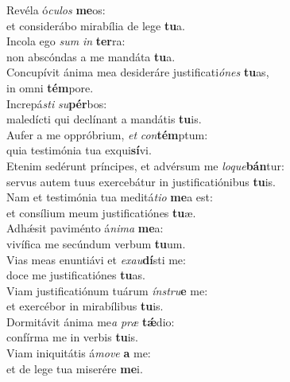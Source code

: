 \evenverse Revéla ó\textit{cu}\textit{los} \textbf{me}os:~\*\\
\evenverse et considerábo mirabília de lege \textbf{tu}a.\\
\oddverse Incola ego \textit{sum} \textit{in} \textbf{ter}ra:~\*\\
\oddverse non abscóndas a me mandáta \textbf{tu}a.\\
\evenverse Concupívit ánima mea desideráre justificati\textit{ó}\textit{nes} \textbf{tu}as,~\*\\
\evenverse in omni \textbf{tém}pore.\\
\oddverse Increpá\textit{sti} \textit{su}\textbf{pér}bos:~\*\\
\oddverse maledícti qui declínant a mandátis \textbf{tu}is.\\
\evenverse Aufer a me oppróbrium, \textit{et} \textit{con}\textbf{tém}ptum:~\*\\
\evenverse quia testimónia tua exqui\textbf{sí}vi.\\
\oddverse Etenim sedérunt príncipes, et advérsum me \textit{lo}\textit{que}\textbf{bán}tur:~\*\\
\oddverse servus autem tuus exercebátur in justificatiónibus \textbf{tu}is.\\
\evenverse Nam et testimónia tua meditá\textit{ti}\textit{o} \textbf{me}a est:~\*\\
\evenverse et consílium meum justificatiónes \textbf{tu}æ.\\
\oddverse Adhǽsit paviménto á\textit{ni}\textit{ma} \textbf{me}a:~\*\\
\oddverse vivífica me secúndum verbum \textbf{tu}um.\\
\evenverse Vias meas enuntiávi et \textit{e}\textit{xau}\textbf{dí}sti me:~\*\\
\evenverse doce me justificatiónes \textbf{tu}as.\\
\oddverse Viam justificatiónum tuárum \textit{ín}\textit{stru}\textbf{e} me:~\*\\
\oddverse et exercébor in mirabílibus \textbf{tu}is.\\
\evenverse Dormitávit ánima me\textit{a} \textit{præ} \textbf{tǽ}dio:~\*\\
\evenverse confírma me in verbis \textbf{tu}is.\\
\oddverse Viam iniquitátis á\textit{mo}\textit{ve} \textbf{a} me:~\*\\
\oddverse et de lege tua miserére \textbf{me}i.\\
